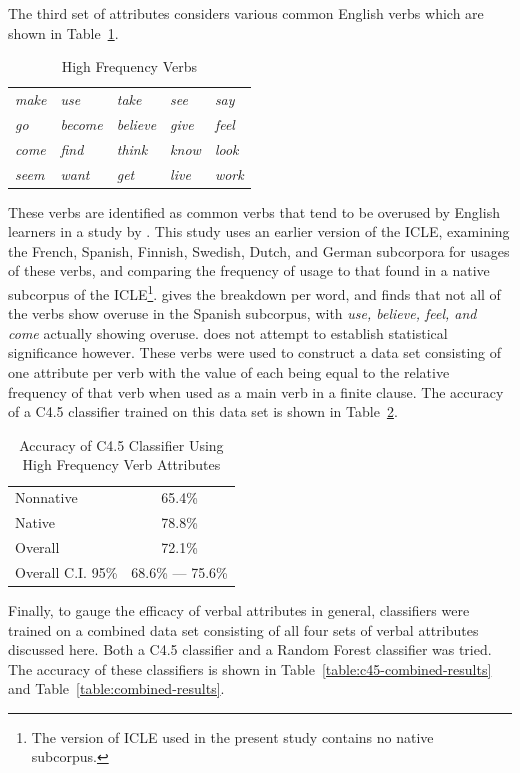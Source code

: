 \documentclass[main.tex]{subfiles}
\begin{document}
The third set of attributes considers various common English verbs which are shown in Table~\ref{table:high-freq-verbs}.
\begin{table}[htbp]
\centering
\caption{High Frequency Verbs}
\begin{tabular}{>{\itshape}l >{\itshape}l >{\itshape}l >{\itshape}l >{\itshape}l}
\toprule
make & use & take & see & say\\
go & become & believe & give & feel\\
come & find & think & know & look\\
seem & want & get & live & work\\
\bottomrule
\end{tabular}
\label{table:high-freq-verbs}
\end{table}
These verbs are identified as common verbs that tend to be overused by English learners in a study by \citet{ringbom:1998}. This study uses an earlier version of the ICLE, examining the French, Spanish, Finnish, Swedish, Dutch, and German subcorpora for usages of these verbs, and comparing the frequency of usage to that found in a native subcorpus of the ICLE\footnote{The version of ICLE used in the present study contains no native subcorpus.}. \citeauthor{ringbom:1998} gives the breakdown per word, and finds that not all of the verbs show overuse in the Spanish subcorpus, with \textit{use, believe, feel, and come} actually showing overuse. \citeauthor{ringbom:1998} does not attempt to establish statistical significance however. These verbs were used to construct a data set consisting of one attribute per verb with the value of each being equal to the relative frequency of that verb when used as a main verb in a finite clause. The accuracy of a C4.5 classifier trained on this data set is shown in Table~\ref{table:high-freq-results}.
\begin{table}[htbp]
\centering
\caption{Accuracy of C4.5 Classifier Using High Frequency Verb Attributes}
\begin{tabular}{l c}
\toprule
Nonnative & 65.4\% \\
Native & 78.8\% \\
Overall & 72.1\% \\
Overall C.I. 95\% & 68.6\% --- 75.6\%\\
\bottomrule
\end{tabular}
\label{table:high-freq-results}
\end{table}

Finally, to gauge the efficacy of verbal attributes in general, classifiers were trained on a combined data set consisting of all four sets of verbal attributes discussed here. Both a C4.5 classifier and a Random Forest classifier was tried. The accuracy of these classifiers is shown in Table~\ref{table:c45-combined-results} and Table~\ref{table:combined-results}.
\end{document}
